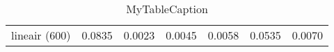 \begin{table}
\centering
\begin{tabular}{|c|c|c|c|c|c|c|}
\hline
 &  &  &  &  &  &  \\
\hline
lineair (600) & 0.0835 & 0.0023 & 0.0045 & 0.0058 & 0.0535 & 0.0070 \\
\hline
\end{tabular}
\caption{MyTableCaption}
\label{table:MyTableLabel}
\end{table}
